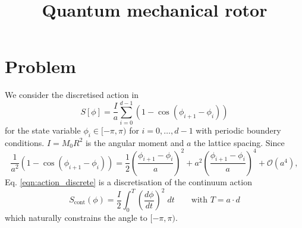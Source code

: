 \documentclass[11pt]{article}
\title{Quantum mechanical rotor}
\begin{document}
\maketitle
\section*{Problem}
We consider the discretised action in \cite{Ammon2016}
\begin{equation}
S[\phi] = \frac{I}{a}\sum_{i=0}^{d-1} \left(
1-\cos(\phi_{i+1}-\phi_i)
\right)\label{eqn:action_discrete}
\end{equation}
for the state variable $\phi_i\in[-\pi,\pi)$ for $i=0,\dots,d-1$ with periodic boundery conditions. $I=M_0R^2$ is the angular moment and $a$ the lattice spacing. Since
\begin{equation}
\frac{1}{a^2}\left(1-\cos(\phi_{i+1}-\phi_i)\right) =
\frac{1}{2}\left(\frac{\phi_{i+1}-\phi_i}{a}\right)^2 + a^2 \left(
\frac{\phi_{i+1}-\phi_i}{a}\right)^4 + \mathcal{O}(a^4),
\end{equation}
Eq. \eqref{eqn:action_discrete} is a discretisation of the continuum action
\begin{equation*}
S_{\text{cont}}(\phi) = \frac{I}{2}\int_{0}^{T} \left(\frac{d\phi}{dt}\right)^2\;dt\qquad\text{with $T=a\cdot d$}
\end{equation*}
which naturally constrains the angle to $[-\pi,\pi)$.
\end{document}
